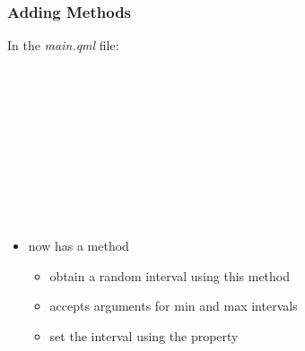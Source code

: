 
\begin{slide}[fragile]\frametitle{Adding Methods}

In the \textit{main.qml} file:

\vspace*{0.5em}
\begin{qml}
\vspace*{0.5em}
\\
\vspace*{0.5em}
\\
\\
\\
\vspace*{0.5em}
\\
\\
\qtt{~~~~~~~~\}}\\
\qtt{~~~~\}}\\
\qtt{\}}\\
\end{qml}

\vspace*{0.5em}
\begin{itemize}
\item {} now has a  method
  \begin{itemize}
  \item obtain a random interval using this method
  \item accepts arguments for min and max intervals
  \item set the interval using the  property
  \end{itemize}
\end{itemize}

\end{slide}





